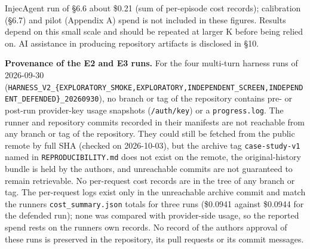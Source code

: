 \documentclass[10pt]{article}
\begin{document}
InjecAgent run of §6.6 about \$0.21 (sum of per-episode cost records); calibration (§6.7) and pilot (Appendix A) spend is not included in these figures. Results depend on this small scale and should be repeated at larger K before being relied on. AI assistance in producing repository artifacts is disclosed in §10.

\textbf{Provenance of the E2 and E3 runs.} For the four multi-turn harness runs of 2026-09-30 (\texttt{HARNESS\_\allowbreak{}V2\_\allowbreak{}\{EXPLORATORY\_\allowbreak{}SMOKE,\allowbreak{}EXPLORATORY,\allowbreak{}INDEPENDENT\_\allowbreak{}SCREEN,\allowbreak{}INDEPENDENT\_\allowbreak{}DEFENDED\}\_20260930}), no branch or tag of the repository contains pre- or post-run provider-key usage snapshots (\texttt{/\allowbreak{}auth/\allowbreak{}key}) or a \texttt{progress.log}. The runner and repository commits recorded in their manifests are not reachable from any branch or tag of the repository. They could still be fetched from the public remote by full SHA (checked on 2026-10-03), but the archive tag \texttt{case-study-v1} named in \texttt{REPRODUCIBILITY.md} does not exist on the remote, the original-history bundle is held by the authors, and unreachable commits are not guaranteed to remain retrievable. No per-request cost records are in the tree of any branch or tag. The per-request logs exist only in the unreachable archive commit and match the runner\textquotesingle s \texttt{cost\_\allowbreak{}summary.json} totals for three runs (\$0.0941 against \$0.0944 for the defended run); none was compared with provider-side usage, so the reported spend rests on the runner\textquotesingle s own records. No record of the authors\textquotesingle{} approval of these runs is preserved in the repository, its pull requests or its commit messages.
\end{document}
